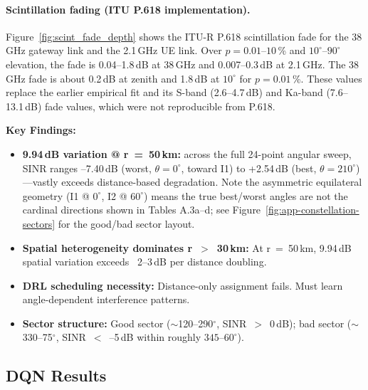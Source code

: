\documentclass[conference]{IEEEtran}
\begin{document}
\paragraph{Scintillation fading (ITU P.618 implementation).}
Figure~\ref{fig:scint_fade_depth} shows the ITU-R P.618 scintillation fade for the 38\,GHz gateway link and the 2.1\,GHz UE link. Over $p=0.01$--$10$\,\% and $10^\circ$--$90^\circ$ elevation, the fade is 0.04--1.8\,dB at 38\,GHz and 0.007--0.3\,dB at 2.1\,GHz. The 38\,GHz fade is about 0.2\,dB at zenith and 1.8\,dB at $10^\circ$ for $p=0.01$\,\%. These values replace the earlier empirical fit and its S-band (2.6--4.7\,dB) and Ka-band (7.6--13.1\,dB) fade values, which were not reproducible from P.618.

\noindent\textbf{Key Findings:}
\begin{itemize}
\item \textbf{9.94\,dB variation @ r~=~50\,km:} across the full 24-point angular sweep, SINR ranges --7.40\,dB (worst, $\theta=0^\circ$, toward I1) to +2.54\,dB (best, $\theta=210^\circ$)—vastly exceeds distance-based degradation. Note the asymmetric equilateral geometry (I1 @ $0^\circ$, I2 @ $60^\circ$) means the true best/worst angles are not the cardinal directions shown in Tables A.3a--d; see Figure~\ref{fig:app-constellation-sectors} for the good/bad sector layout.
\item \textbf{Spatial heterogeneity dominates r~$>$~30\,km:} At r~=~50\,km, 9.94\,dB spatial variation exceeds ~2--3\,dB per distance doubling.
\item \textbf{DRL scheduling necessity:} Distance-only assignment fails. Must learn angle-dependent interference patterns.
\item \textbf{Sector structure:} Good sector ($\sim$120--290$^\circ$, SINR~$>$~0\,dB); bad sector ($\sim$330--75$^\circ$, SINR~$<$~--5\,dB within roughly $345$--$60^\circ$).
\end{itemize}

\subsection{DQN Results}
\label{sec:dqn-results}
\end{document}

